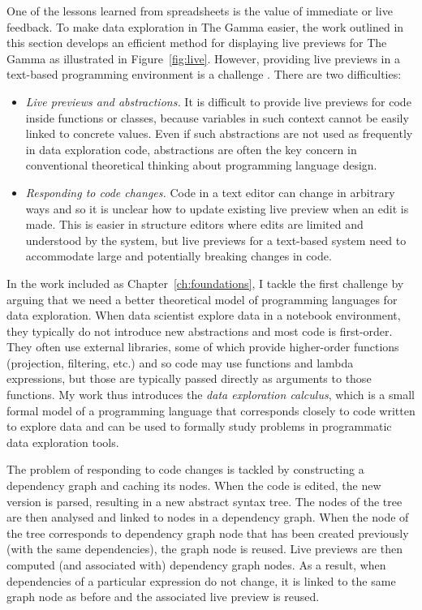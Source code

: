 \documentclass[fleqn,11pt]{report}
\theoremstyle{definition}
\newenvironment{nitemize}
{ \vspace{-0.4em}
  \begin{itemize}
    \setlength{\itemsep}{5pt}
    \setlength{\parskip}{0pt}
    \setlength{\parsep}{0pt} }
{ \end{itemize}
  \vspace{-0.4em} }
\begin{document}
One of the lessons learned from spreadsheets is the value of immediate or live feedback.
To make data exploration in The Gamma easier, the work outlined in this section develops an
efficient method for displaying live previews for The Gamma as illustrated in
Figure~\ref{fig:live}. However, providing live previews in a text-based programming environment
is a challenge \citep{mcdirmid-2007-live}. There are two difficulties:

\begin{nitemize}
\item \emph{Live previews and abstractions.} It is difficult to provide live previews for code
  inside functions or classes, because variables in such context cannot be easily linked to
  concrete values. Even if such abstractions are not used as frequently in data exploration code,
  abstractions are often the key concern in conventional theoretical thinking about programming
  language design.

\item \emph{Responding to code changes.} Code in a text editor can change in arbitrary ways and
  so it is unclear how to update existing live preview when an edit is made. This is easier in
  structure editors where edits are limited and understood by the system, but live previews for
  a text-based system need to accommodate large and potentially breaking changes in code.
\end{nitemize}

In the work included as Chapter~\ref{ch:foundations}, I tackle the first challenge by arguing that
we need a better theoretical model of programming languages for data exploration. When data
scientist explore data in a notebook environment, they typically do not introduce new abstractions
and most code is first-order. They often use external libraries, some of which provide higher-order
functions (projection, filtering, etc.) and so code may use functions and lambda expressions,
but those are typically passed directly as arguments to those functions. My work thus introduces
the \emph{data exploration calculus}, which is a small formal model of a programming language
that corresponds closely to code written to explore data and can be used to formally study
problems in programmatic data exploration tools.

The problem of responding to code changes is tackled by constructing a dependency graph and
caching its nodes. When the code is edited, the new version is parsed, resulting in a new
abstract syntax tree. The nodes of the tree are then analysed and linked to nodes in a
dependency graph. When the node of the tree corresponds to dependency graph node that has been
created previously (with the same dependencies), the graph node is reused. Live previews are
then computed (and associated with) dependency graph nodes. As a result, when dependencies of
a particular expression do not change, it is linked to the same graph node as before and the
associated live preview is reused.
\end{document}
